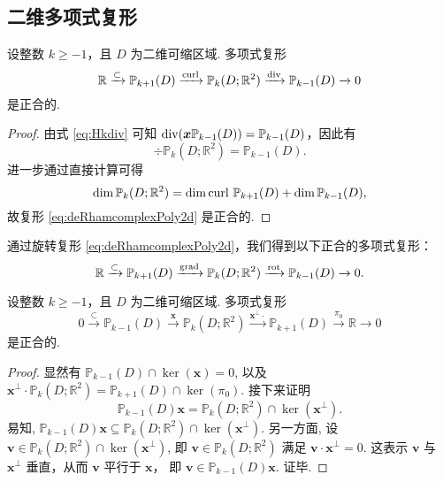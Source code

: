 \subsection{二维多项式复形}
\begin{lemma}
设整数 $k\geq-1$，且 $D$ 为二维可缩区域.
多项式复形
\begin{equation}\label{eq:deRhamcomplexPoly2d}
\mathbb R\xrightarrow{\subset} \mathbb P_{k+1}(D)\xrightarrow{\operatorname{curl}} \mathbb P_k(D;\mathbb R^2) \xrightarrow{\operatorname{div}} \mathbb P_{k-1}(D)\xrightarrow{}0
\end{equation}
是正合的.  
\end{lemma}
\begin{proof}
由式 \eqref{eq:Hkdiv} 可知
$\operatorname{div}(\boldsymbol x \mathbb P_{k-1}(D)) = \mathbb P_{k-1}(D)$，因此有
\[
\div \mathbb P_k(D;\mathbb R^2) = \mathbb P_{k-1}(D).
\]
进一步通过直接计算可得
\[
\dim\mathbb P_k(D;\mathbb R^2)=\dim \operatorname{curl} \, \mathbb P_{k+1}(D)+\dim \mathbb P_{k-1}(D),
\]
故复形 \eqref{eq:deRhamcomplexPoly2d} 是正合的.
\end{proof}

通过旋转复形 \eqref{eq:deRhamcomplexPoly2d}，我们得到以下正合的多项式复形：
\begin{equation*}
\mathbb R\xrightarrow{\subset} \mathbb P_{k+1}(D)\xrightarrow{\operatorname{grad}} \mathbb P_k(D;\mathbb R^2) \xrightarrow{\operatorname*{rot}} \mathbb P_{k-1}(D)\xrightarrow{}0.
\end{equation*}


\begin{lemma}
设整数 $k\geq-1$，且 $D$ 为二维可缩区域.
多项式复形
\begin{equation}\label{eq:KoszulcomplexPoly2d}
0\xrightarrow{\subset}\mathbb P_{k-1}(D) \xrightarrow{\boldsymbol x} \mathbb P_k(D;\mathbb R^2) \xrightarrow{\boldsymbol x^{\perp}\cdot} \mathbb P_{k+1}(D)\xrightarrow{\pi_{0}}\mathbb R\xrightarrow{}0
\end{equation}
是正合的.  
\end{lemma}
\begin{proof}
显然有 $\mathbb P_{k-1}(D)\cap\ker(\boldsymbol{x})=0$, 以及 $\boldsymbol x^{\perp}\cdot\mathbb P_k(D;\mathbb R^2)=\mathbb P_{k+1}(D)\cap\ker(\pi_0)$. 接下来证明
$$
\mathbb P_{k-1}(D)\boldsymbol{x} = \mathbb P_k(D;\mathbb R^2)\cap\ker(\boldsymbol x^{\perp}).
$$ 
易知, $\mathbb P_{k-1}(D)\boldsymbol{x} \subseteq \mathbb P_k(D;\mathbb R^2)\cap\ker(\boldsymbol x^{\perp})$. 另一方面, 设 $\boldsymbol{v}\in\mathbb P_k(D;\mathbb R^2)\cap\ker(\boldsymbol x^{\perp})$, 即 $\boldsymbol{v}\in\mathbb P_k(D;\mathbb R^2)$ 满足 $\boldsymbol{v}\cdot \boldsymbol x^{\perp}=0$. 这表示 $\boldsymbol{v}$ 与 $\boldsymbol x^{\perp}$ 垂直，从而 $\boldsymbol{v}$ 平行于 $\boldsymbol{x}$， 即 $\boldsymbol{v}\in \mathbb P_{k-1}(D)\boldsymbol{x}$. 证毕.
\end{proof}

